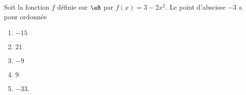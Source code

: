 
\begin{exercice}\label{exosmath-0389}

    Soit la fonction \( f\) définie sur \( \eR\) par \( f(x)=3-2x^2\). Le point d'abscisse \( -3\) a pour ordonnée
    \begin{multicols}{3}
        \begin{enumerate}
            \item
                \( -15\)
            \item
                \( 21\)
            \item
                \( -9\)
            \item
                \( 9 \)
            \item
                \( -33\).
        \end{enumerate}
    \end{multicols}

\end{exercice}
